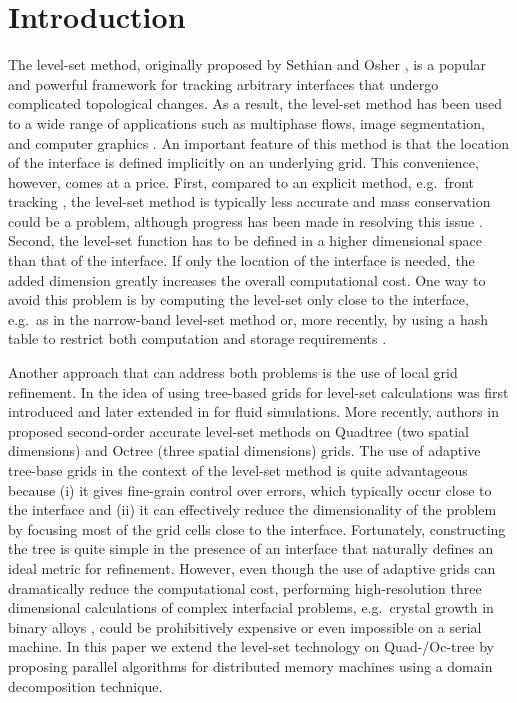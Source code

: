 \section{Introduction}\label{sec:introduction}
The level-set method, originally proposed by Sethian and Osher \cite{Osher;Sethian:88:Fronts-Propagating-w}, is a popular and powerful framework for tracking arbitrary interfaces that undergo complicated topological changes. As a result, the level-set method has been used to a wide range of applications such as multiphase flows, image segmentation, and computer graphics \cite{Osher;Fedkiw:02:Level-Set-Methods-an,Sethian:99:Level-set-methods-an}. An important feature of this method is that the location of the interface is defined implicitly on an underlying grid. This convenience, however, comes at a price. First, compared to an explicit method, e.g.\ front tracking \cite{Juric:96:A-Front-Tracking-Met, Tryggvason;Bunner;Esmaeeli;etal:01:A-Front-Tracking-Met}, the level-set method is typically less accurate and mass conservation could be a problem, although progress has been made in resolving this issue \cite{Enright;Fedkiw;Ferziger;etal:02:A-Hybrid-Particle-Le}. Second, the level-set function has to be defined in a higher dimensional space than that of the interface. If only the location of the interface is needed, the added dimension greatly increases the overall computational cost. One way to avoid this problem is by computing the level-set only close to the interface, e.g.\ as in the narrow-band level-set method \cite{Adalsteinsson;Sethian:95:A-Fast-Level-Set-Met} or, more recently, by using a hash table to restrict both computation and storage requirements \cite{Brun;Guittet;Gibou:12:A-local-level-set-me}.

Another approach that can address both problems is the use of local grid refinement. In \cite{Strain:99:Tree-Methods-for-Mov} the idea of using tree-based grids for level-set calculations was first introduced and later extended in \cite{Popinet:03:Gerris:-A-Tree-Based, Losasso;Gibou;Fedkiw:04:Simulating-Water-and} for fluid simulations. More recently, authors in \cite{Min;Gibou:07:A-second-order-accur} proposed second-order accurate level-set methods on Quadtree (two spatial dimensions) and Octree (three spatial dimensions) grids. The use of adaptive tree-base grids in the context of the level-set method is quite advantageous because (i) it gives fine-grain control over errors, which typically occur close to the interface and (ii) it can effectively reduce the dimensionality of the problem by focusing most of the grid cells close to the interface. Fortunately, constructing the tree is quite simple in the presence of an interface that naturally defines an ideal metric for refinement. However, even though the use of adaptive grids can dramatically reduce the computational cost, performing high-resolution three dimensional calculations of complex interfacial problems, e.g.\ crystal growth in binary alloys \cite{Theillard;Gibou;Pollock:14:A-Sharp-Computationa}, could be prohibitively expensive or even impossible on a serial machine. In this paper we extend the level-set technology on Quad-/Oc-tree by proposing parallel algorithms for distributed memory machines using a domain decomposition technique.

